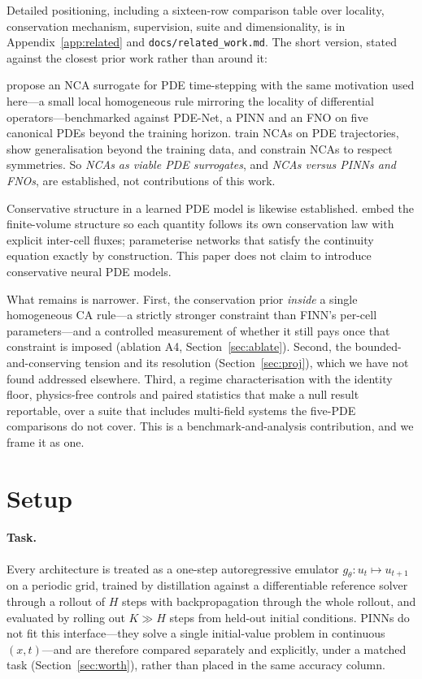 \documentclass{article}
\newcommand{\code}[1]{\texttt{\small #1}}
\begin{document}
Detailed positioning, including a sixteen-row comparison table over locality,
conservation mechanism, supervision, suite and dimensionality, is in
Appendix~\ref{app:related} and \code{docs/related\_work.md}. The short version, stated
against the closest prior work rather than around it:

\citet{saha2026nca} propose an NCA surrogate for PDE time-stepping with the same
motivation used here---a small local homogeneous rule mirroring the locality of
differential operators---benchmarked against PDE-Net, a PINN and an FNO on five canonical
PDEs beyond the training horizon. \citet{richardson2023nca} train NCAs on PDE
trajectories, show generalisation beyond the training data, and constrain NCAs to respect
symmetries. So \emph{NCAs as viable PDE surrogates}, and \emph{NCAs versus PINNs and
FNOs}, are established, not contributions of this work.

Conservative structure in a learned PDE model is likewise established.
\citet{praditia2021finn} embed the finite-volume structure so each quantity follows its
own conservation law with explicit inter-cell fluxes; \citet{richterpowell2022ncl}
parameterise networks that satisfy the continuity equation exactly by construction. This
paper does not claim to introduce conservative neural PDE models.

What remains is narrower. First, the conservation prior \emph{inside} a single homogeneous
CA rule---a strictly stronger constraint than FINN's per-cell parameters---and a
controlled measurement of whether it still pays once that constraint is imposed (ablation
A4, Section~\ref{sec:ablate}). Second, the bounded-and-conserving tension and its
resolution (Section~\ref{sec:proj}), which we have not found addressed elsewhere. Third,
a regime characterisation with the identity floor, physics-free controls and paired
statistics that make a null result reportable, over a suite that includes multi-field
systems the five-PDE comparisons do not cover. This is a benchmark-and-analysis
contribution, and we frame it as one.

\section{Setup}
\label{sec:setup}

\paragraph{Task.} Every architecture is treated as a one-step autoregressive emulator
$g_\theta: u_t \mapsto u_{t+1}$ on a periodic grid, trained by distillation against a
differentiable reference solver through a rollout of $H$ steps with backpropagation
through the whole rollout, and evaluated by rolling out $K \gg H$ steps from held-out
initial conditions. PINNs do not fit this interface---they solve a single initial-value
problem in continuous $(x,t)$---and are therefore compared separately and explicitly,
under a matched task (Section~\ref{sec:worth}), rather than placed in the same accuracy
column.
\end{document}
